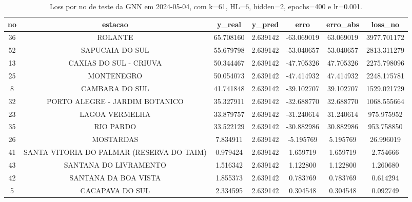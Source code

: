 \begin{table}[h]
\centering
\caption{Loss por no de teste da GNN em 2024-05-04, com k=61, HL=6, hidden=2, epochs=400 e lr=0.001.}
\label{tab:gnn_loss_k61_hl6_h2_e400_d20240504}
\begin{tabular}{ccccccc}
\toprule
no & estacao & y\_real & y\_pred & erro & erro\_abs & loss\_no \\
\midrule
36 & ROLANTE & 65.708160 & 2.639142 & -63.069019 & 63.069019 & 3977.701172 \\
52 & SAPUCAIA DO SUL & 55.679798 & 2.639142 & -53.040657 & 53.040657 & 2813.311279 \\
13 & CAXIAS DO SUL - CRIUVA & 50.344467 & 2.639142 & -47.705326 & 47.705326 & 2275.798096 \\
25 & MONTENEGRO & 50.054073 & 2.639142 & -47.414932 & 47.414932 & 2248.175781 \\
8 & CAMBARA DO SUL & 41.741848 & 2.639142 & -39.102707 & 39.102707 & 1529.021729 \\
32 & PORTO ALEGRE - JARDIM BOTANICO & 35.327911 & 2.639142 & -32.688770 & 32.688770 & 1068.555664 \\
23 & LAGOA VERMELHA & 33.879757 & 2.639142 & -31.240614 & 31.240614 & 975.975952 \\
35 & RIO PARDO & 33.522129 & 2.639142 & -30.882986 & 30.882986 & 953.758850 \\
26 & MOSTARDAS & 7.834911 & 2.639142 & -5.195769 & 5.195769 & 26.996019 \\
41 & SANTA VITORIA DO PALMAR (RESERVA DO TAIM) & 0.979424 & 2.639142 & 1.659719 & 1.659719 & 2.754666 \\
43 & SANTANA DO LIVRAMENTO & 1.516342 & 2.639142 & 1.122800 & 1.122800 & 1.260680 \\
42 & SANTANA DA BOA VISTA & 1.855373 & 2.639142 & 0.783769 & 0.783769 & 0.614294 \\
5 & CACAPAVA DO SUL & 2.334595 & 2.639142 & 0.304548 & 0.304548 & 0.092749 \\
\bottomrule
\end{tabular}
\end{table}
